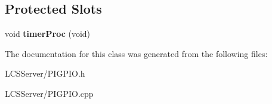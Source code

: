 \subsection*{Protected Slots}
\begin{DoxyCompactItemize}
\item 
\mbox{\label{class_p_i_g_p_i_o_ad14366d5bc2af5abedf226b6557e12df}} 
void {\bfseries timer\+Proc} (void)
\end{DoxyCompactItemize}


The documentation for this class was generated from the following files\+:\begin{DoxyCompactItemize}
\item 
L\+C\+S\+Server/P\+I\+G\+P\+I\+O.\+h\item 
L\+C\+S\+Server/P\+I\+G\+P\+I\+O.\+cpp\end{DoxyCompactItemize}
